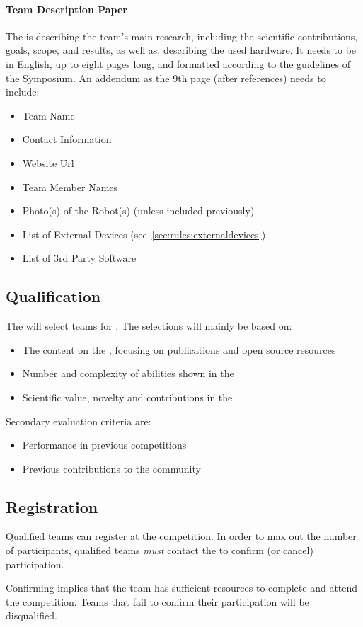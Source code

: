 \paragraph{Team Description Paper}
\label{sec:rules:application:tdp}
The \TDP{} is describing the team's main research, including the scientific contributions, goals, scope, and results, as well as, describing the used hardware. It needs to be in English, up to eight pages long, and formatted according to the guidelines of the \RoboCup{} Symposium. 
An addendum as the 9th page (after references) needs to include:
\begin{itemize}
	\item Team Name
	\item Contact Information
	\item Website Url
	\item Team Member Names
	\item Photo(s) of the Robot(s) (unless included previously) 
	\item List of External Devices (see~\ref{sec:rules:externaldevices})
	\item List of 3rd Party Software
\end{itemize}


\subsection{Qualification}
\label{sec:rules:qualification}
The \OC{} will select teams for \Qualification{}. The selections will mainly be based on:
\begin{itemize}
	\item The content on the \TeamWebsite{}, focusing on publications and open source resources
	\item Number and complexity of abilities shown in the \TeamVideo{}
	\item Scientific value, novelty and contributions in the \TDP{}

\end{itemize}
Secondary evaluation criteria are:
\begin{itemize}
	\item Performance in previous competitions
	\item Previous contributions to the \AtHome{} community
\end{itemize}


\subsection{Registration}
\label{sec:rules:registration}
Qualified teams can register at the \RoboCup\AtHome{} competition. In order to max out the number of participants, qualified teams \emph{must} contact the \OC{} to confirm (or cancel) participation.

Confirming implies that the team has sufficient resources to complete \Registration{} and attend the competition. Teams that fail to confirm their participation will be disqualified.